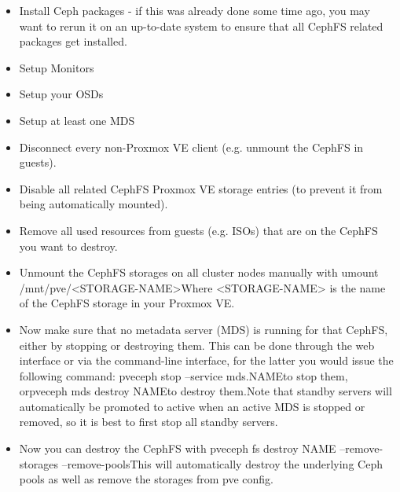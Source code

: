 \begin{itemize}[leftmargin=2cm]

	\item Install Ceph packages - if this was already done some time ago, you may want to rerun it on an up-to-date system to ensure that all CephFS related packages get installed.

	\item Setup Monitors

	\item Setup your OSDs

	\item Setup at least one MDS

\end{itemize}

\begin{itemize}[leftmargin=2cm]

	\item Disconnect every non-Proxmox VE client (e.g. unmount the CephFS in guests).

	\item Disable all related CephFS Proxmox VE storage entries (to prevent it from being automatically mounted).

	\item Remove all used resources from guests (e.g. ISOs) that are on the CephFS you want to destroy.

	\item Unmount the CephFS storages on all cluster nodes manually with umount /mnt/pve/<STORAGE-NAME>Where <STORAGE-NAME> is the name of the CephFS storage in your Proxmox VE.

	\item Now make sure that no metadata server (MDS) is running for that CephFS, either by stopping or destroying them. This can be done through the web interface or via the command-line interface, for the latter you would issue the following command: pveceph stop --service mds.NAMEto stop them, orpveceph mds destroy NAMEto destroy them.Note that standby servers will automatically be promoted to active when an active MDS is stopped or removed, so it is best to first stop all standby servers.

	\item Now you can destroy the CephFS with pveceph fs destroy NAME --remove-storages --remove-poolsThis will automatically destroy the underlying Ceph pools as well as remove the storages from pve config.

\end{itemize}


